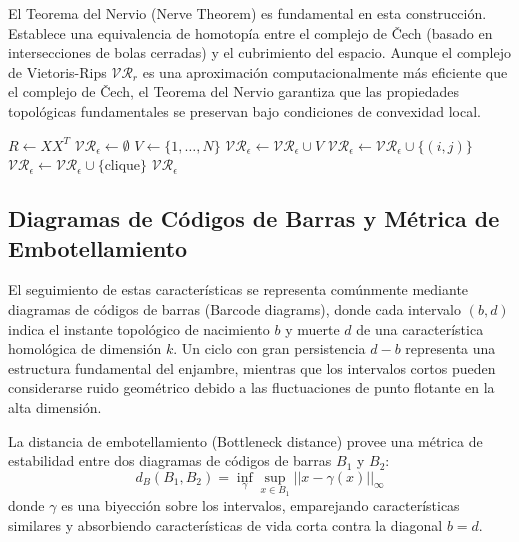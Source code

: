 El Teorema del Nervio (Nerve Theorem) es fundamental en esta construcción. Establece una equivalencia de homotopía entre el complejo de Čech (basado en intersecciones de bolas cerradas) y el cubrimiento del espacio. Aunque el complejo de Vietoris-Rips $\mathcal{VR}_r$ es una aproximación computacionalmente más eficiente que el complejo de Čech, el Teorema del Nervio garantiza que las propiedades topológicas fundamentales se preservan bajo condiciones de convexidad local.

\begin{algorithm}

\begin{algorithmic}[1]
    \State $R \gets X X^T$ 
    \State $\mathcal{VR}_\epsilon \gets \emptyset$
    \State $V \gets \{1, \dots, N\}$
    \State $\mathcal{VR}_\epsilon \gets \mathcal{VR}_\epsilon \cup V$ 
                \State $\mathcal{VR}_\epsilon \gets \mathcal{VR}_\epsilon \cup \{(i, j)\}$ 
            \EndIf
        \EndFor
    \EndFor
            \State $\mathcal{VR}_\epsilon \gets \mathcal{VR}_\epsilon \cup \{\text{clique}\}$ 
        \EndFor
    \EndFor
    \State \Return $\mathcal{VR}_\epsilon$
\EndProcedure
\end{algorithmic}
\end{algorithm}

\subsection{Diagramas de Códigos de Barras y Métrica de Embotellamiento}

El seguimiento de estas características se representa comúnmente mediante diagramas de códigos de barras (Barcode diagrams), donde cada intervalo $(b, d)$ indica el instante topológico de nacimiento $b$ y muerte $d$ de una característica homológica de dimensión $k$. Un ciclo con gran persistencia $d - b$ representa una estructura fundamental del enjambre, mientras que los intervalos cortos pueden considerarse ruido geométrico debido a las fluctuaciones de punto flotante en la alta dimensión.

La distancia de embotellamiento (Bottleneck distance) provee una métrica de estabilidad entre dos diagramas de códigos de barras $B_1$ y $B_2$:
$$ d_B(B_1, B_2) = \inf_{\gamma} \sup_{x \in B_1} || x - \gamma(x) ||_\infty $$
donde $\gamma$ es una biyección sobre los intervalos, emparejando características similares y absorbiendo características de vida corta contra la diagonal $b=d$.

